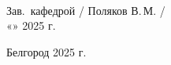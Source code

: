 \vfill         %

\begin{center}
\\[2em]
Зав.\ кафедрой \underline{\hspace{4cm}} / Поляков В.\,М. /\\[2em]
«\underline{\hspace{1cm}}» \underline{\hspace{4cm}} 2025 г.
\end{center}

\vspace{4em}

\begin{center}
Белгород 2025 г.
\end{center}
